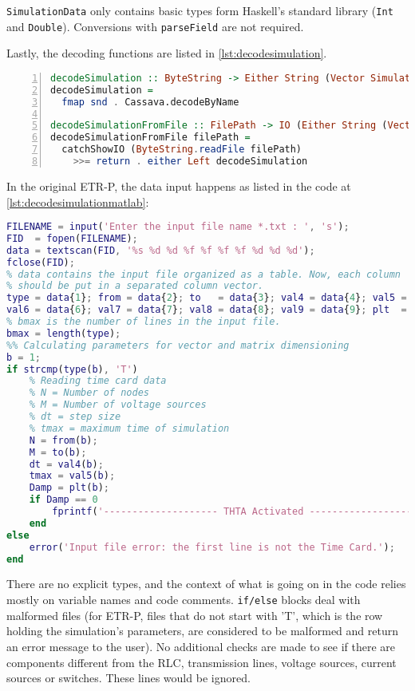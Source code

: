 \lstinline!SimulationData! only contains basic types form Haskell's standard library (\lstinline!Int! and \lstinline!Double!). Conversions with \lstinline!parseField! are not required.

Lastly, the decoding functions are listed in \cref{lst:decodesimulation}.

\begin{lstlisting}[language=Haskell, numbers=left, caption={Decoding the CSV simulation file}, captionpos=b, label={lst:decodesimulation}]
decodeSimulation :: ByteString -> Either String (Vector SimulationData)
decodeSimulation =
  fmap snd . Cassava.decodeByName

decodeSimulationFromFile :: FilePath -> IO (Either String (Vector SimulationData))
decodeSimulationFromFile filePath =
  catchShowIO (ByteString.readFile filePath)
    >>= return . either Left decodeSimulation

\end{lstlisting}


In the original ETR-P, the data input happens as listed in the code at \cref{lst:decodesimulationmatlab}:

\begin{lstlisting}[language=Matlab, caption={Shortened version of ETR-P Matlab code to read the input data}, captionpos=b, label={lst:decodesimulationmatlab}]
FILENAME = input('Enter the input file name *.txt : ', 's');
FID  = fopen(FILENAME);
data = textscan(FID, '%s %d %d %f %f %f %f %d %d %d');
fclose(FID);
% data contains the input file organized as a table. Now, each column
% should be put in a separated column vector.
type = data{1}; from = data{2}; to   = data{3}; val4 = data{4}; val5 = data{5};
val6 = data{6}; val7 = data{7}; val8 = data{8}; val9 = data{9}; plt  = data{10};
% bmax is the number of lines in the input file.
bmax = length(type);
%% Calculating parameters for vector and matrix dimensioning
b = 1;
if strcmp(type(b), 'T')
    % Reading time card data
    % N = Number of nodes
    % M = Number of voltage sources
    % dt = step size
    % tmax = maximum time of simulation
    N = from(b);
    M = to(b);
    dt = val4(b);
    tmax = val5(b);
    Damp = plt(b);
    if Damp == 0
        fprintf('-------------------- THTA Activated --------------------\r');
    end
else
    error('Input file error: the first line is not the Time Card.');
end
\end{lstlisting}

There are no explicit types, and the context of what is going on in the code relies mostly on variable names and code comments. \lstinline!if/else! blocks deal with malformed files (for ETR-P, files that do not start with 'T', which is the row holding the simulation's parameters, are considered to be malformed and return an error message to the user). No additional checks are made to see if there are components different from the RLC, transmission lines, voltage sources, current sources or switches. These lines would be ignored.




